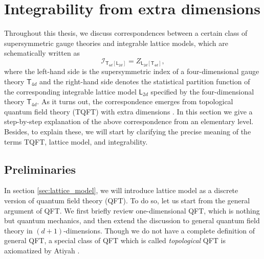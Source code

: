 \begin{comment}
\documentclass[11pt]{article}  %
\usepackage{Common/toshi}

\end{comment}


\section{Integrability from extra dimensions}
\label{sec:integrability}


Throughout this thesis, we discuss correspondences between
a certain class of supersymmetric gauge theories and integrable lattice
models, which are schematically written as
\begin{equation}
  \mathcal{I}_{\mathsf{T}_{4d}\left[\mathsf{L}_{2d}\right]}
    =  Z_{\mathsf{L}_{2d}\left[\mathsf{T}_{4d}\right]},
  \label{eq:correspondence}
\end{equation}
where the left-hand side is the supersymmetric index of a four-dimensional
gauge theory $\mathsf{T}_{4d}$ and the right-hand side denotes the
statistical partition function of the corresponding integrable lattice
model $\mathsf{L}_{2d}$ specified by the four-dimensional theory
$\mathsf{T}_{4d}$. As it turns out, the correspondence emerges from
topological quantum field theory (TQFT) with extra dimensions \cite{Yagi:2015lha}.
In this section
we give a step-by-step explanation of the above correspondence from
an elementary level. Besides, to explain these, we will start by clarifying
the precise meaning of the terms TQFT, lattice model, and integrability.





\subsection{Preliminaries}
\label{sec:preliminaries}

In section \ref{sec:lattice_model}, we will introduce lattice model as
a discrete version of quantum field theory (QFT).
To do so, let us start from the general
argument of QFT. We first briefly review one-dimensional QFT, which
is nothing but quantum mechanics, and then extend the discussion to
general quantum field theory in $(d+1)$-dimensions. Though we do
not have a complete definition of general QFT, a special class of
QFT which is called \emph{topological} QFT is axiomatized by Atiyah
\cite{Atiyah:1989vu}.





